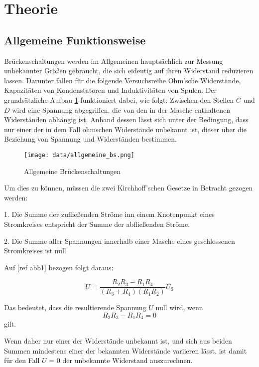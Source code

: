 \section{Theorie}
\label{sec:Theorie}

\subsection{Allgemeine Funktionsweise}

Brückenschaltungen werden im Allgemeinen hauptsächlich zur Messung unbekannter Größen 
gebraucht, die sich eideutig auf ihren Widerstand reduzieren lassen. Darunter fallen für
die folgende Versuchsreihe Ohm'sche Widerstände, Kapazitäten von Kondenstatoren und 
Induktivitäten von Spulen. Der grundsätzliche Aufbau \ref{fig:allg} funktioniert dabei, wie folgt:
Zwischen den Stellen $C$ und $D$ wird eine Spannung abgegriffen, die von den in der Masche 
enthaltenen Widerständen abhängig ist. Anhand dessen lässt sich unter der Bedingung, dass 
nur einer der in dem Fall ohmschen Widerstände unbekannt ist, dieser über die Beziehung
von Spannung und Widerständen bestimmen. 
\begin{figure}
\centering
\texttt{[image: data/allgemeine\_bs.png]}
\caption{Allgemeine Brückenschaltungen}
\label{fig:allg}
\end{figure}

Um dies zu können, müssen die zwei Kirchhoff'schen Gesetze in Betracht gezogen werden:

1.  Die Summe der zufließenden Ströme inn einem Knotenpunkt eines Stromkreises entspricht
    der Summe der abfließenden Ströme.

2.  Die Summe aller Spannungen innerhalb einer Masche eines geschlossenen Stromkreises
    ist null.

Auf [ref abb1] bezogen folgt daraus:

\begin{equation}
    U = \frac{{R_2}{R_3}-{R_1}{R_4}}{({R_3}+{R_4})({R_1}{R_2})}U_{\text{S}} 
\end{equation}

Das bedeutet, dass die resultierende Spannung $U$ null wird, wenn 
\begin{equation}
    R_2 R_3 - R_1 R_4 = 0
\end{equation}
gilt.

Wenn daher nur einer der Widerstände unbekannt ist, und sich aus beiden Summen mindestens einer
der bekannten Widerstände variieren lässt, ist damit für den Fall $U$ = 0 der unbekannte Widerstand
auszurechnen.

